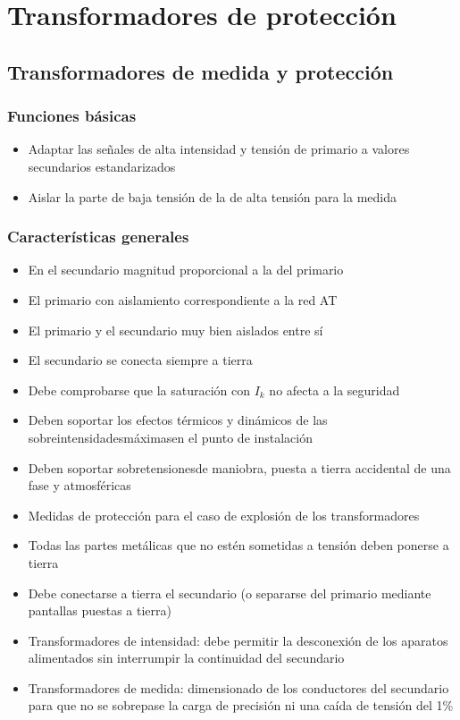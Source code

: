 \chapter{Transformadores de protección}
\section{Transformadores de medida y protección}
\subsection{Funciones básicas}
\begin{itemize}
	\item Adaptar las señales de alta intensidad y tensión de primario a valores secundarios estandarizados
	\item Aislar la parte de baja tensión de la de alta tensión para la medida
\end{itemize}
\subsection{Características generales}
\begin{itemize}
	\item En el secundario magnitud proporcional a la del primario
	\item El primario con aislamiento correspondiente a la red AT
	\item El primario y el secundario muy bien aislados entre sí
	\item El secundario se conecta siempre a tierra
	\item Debe comprobarse que la saturación con $I_k$ no afecta a la seguridad
	\item Deben soportar los efectos térmicos y dinámicos de las sobreintensidadesmáximasen el punto de instalación
	\item Deben soportar sobretensionesde maniobra, puesta a tierra accidental de una fase y atmosféricas
	\item Medidas de protección para el caso de explosión de los transformadores
	\item Todas las partes metálicas que no estén sometidas a tensión deben ponerse a tierra
	\item Debe conectarse a tierra el secundario (o separarse del primario mediante pantallas puestas a tierra)
	\item Transformadores de intensidad: debe permitir la desconexión de los aparatos alimentados sin interrumpir la continuidad del secundario
	\item Transformadores de medida: dimensionado de los conductores del secundario para que no se sobrepase la carga de precisión ni una caída de tensión del 1\%
\end{itemize}

